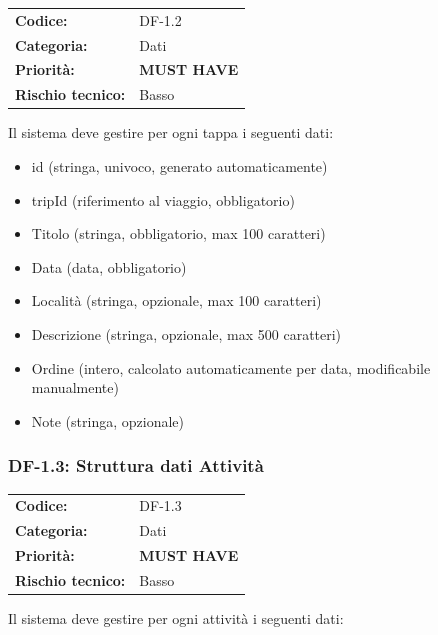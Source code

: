 \documentclass[12pt, a4paper]{article}
\newcommand{\MUST}{\colorbox{musthave}{\small\textbf{MUST HAVE}}}
\newcommand{\RISKL}{\colorbox{risklow}{\small Basso}}
\begin{document}
\begin{tabular}{@{}ll@{}}
  \toprule
  \textbf{Codice:}          & DF-1.2 \\
  \textbf{Categoria:}       & Dati \\
  \textbf{Priorità:}        & \MUST \\
  \textbf{Rischio tecnico:} & \RISKL \\
  \bottomrule
\end{tabular}

\medskip
\noindent
Il sistema deve gestire per ogni tappa i seguenti dati:

\begin{itemize}[leftmargin=1.5em, itemsep=1pt]
  \item id (stringa, univoco, generato automaticamente)
  \item tripId (riferimento al viaggio, obbligatorio)
  \item Titolo (stringa, obbligatorio, max 100 caratteri)
  \item Data (data, obbligatorio)
  \item Località (stringa, opzionale, max 100 caratteri)
  \item Descrizione (stringa, opzionale, max 500 caratteri)
  \item Ordine (intero, calcolato automaticamente per data, modificabile manualmente)
  \item Note (stringa, opzionale)
\end{itemize}

\subsubsection{DF-1.3: Struttura dati Attività}

\begin{tabular}{@{}ll@{}}
  \toprule
  \textbf{Codice:}          & DF-1.3 \\
  \textbf{Categoria:}       & Dati \\
  \textbf{Priorità:}        & \MUST \\
  \textbf{Rischio tecnico:} & \RISKL \\
  \bottomrule
\end{tabular}

\medskip
\noindent
Il sistema deve gestire per ogni attività i seguenti dati:
\end{document}
